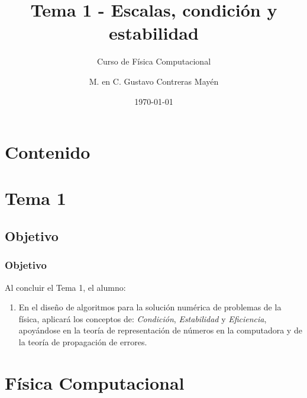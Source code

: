 



\title{\large{Tema 1 - Escalas, condición y estabilidad}}
\subtitle{Curso de Física Computacional}
\author[]{M. en C. Gustavo Contreras Mayén}
\date{\today}

\maketitle
\section*{Contenido}
\fontsize{14}{14}\selectfont
{}
\section{Tema 1}
\subsection{Objetivo}
\begin{frame}
\frametitle{Objetivo}
Al concluir el Tema 1, el alumno:
\begin{enumerate}
\item En el diseño de algoritmos para la solución numérica de problemas de la física, aplicará los conceptos de: \textit{Condición}, \textit{Estabilidad} y \textit{Eficiencia}, apoyándose en la teoría de representación de números en la computadora y de la teoría de propagación de errores.
\end{enumerate}
\end{frame}
\section{Física Computacional}
